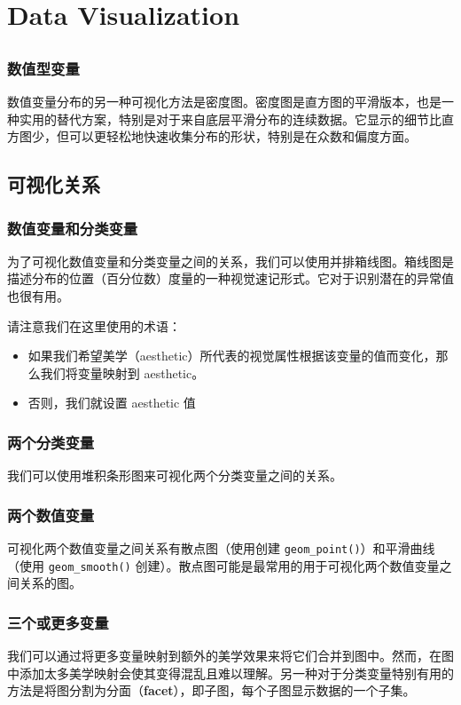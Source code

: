 \chapter{Data Visualization\label{ch01}}
\section{}
\subsection{数值型变量}
数值变量分布的另一种可视化方法是密度图。密度图是直方图的平滑版本，也是一种实用的替代方案，特别是对于来自底层平滑分布的连续数据。它显示的细节比直方图少，但可以更轻松地快速收集分布的形状，特别是在众数和偏度方面。
\section{可视化关系}
\subsection{数值变量和分类变量}
为了可视化数值变量和分类变量之间的关系，我们可以使用并排箱线图。箱线图是描述分布的位置（百分位数）度量的一种视觉速记形式。它对于识别潜在的异常值也很有用。

请注意我们在这里使用的术语：
\begin{itemize}
    \item 如果我们希望美学（aesthetic）所代表的视觉属性根据该变量的值而变化，那么我们将变量映射到 aesthetic。
    \item 否则，我们就设置 aesthetic 值
\end{itemize}

\subsection{两个分类变量}
我们可以使用堆积条形图来可视化两个分类变量之间的关系。
\subsection{两个数值变量}
可视化两个数值变量之间关系有散点图（使用创建 \verb|geom_point()|）和平滑曲线（使用 \verb|geom_smooth()| 创建）。散点图可能是最常用的用于可视化两个数值变量之间关系的图。
\subsection{三个或更多变量}
我们可以通过将更多变量映射到额外的美学效果来将它们合并到图中。然而，在图中添加太多美学映射会使其变得混乱且难以理解。另一种对于分类变量特别有用的方法是将图分割为分面（\textbf{facet}），即子图，每个子图显示数据的一个子集。

